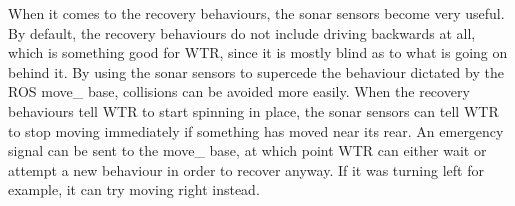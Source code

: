 When it comes to the recovery behaviours, the sonar sensors become very useful.
By default, the recovery behaviours do not include driving backwards at all, which is something good for WTR, since it is mostly blind as to what is going on behind it.
By using the sonar sensors to supercede the behaviour dictated by the ROS move\_ base, collisions can be avoided more easily.
When the recovery behaviours tell WTR to start spinning in place, the sonar sensors can tell WTR to stop moving immediately if something has moved near its rear.
An emergency signal can be sent to the move\_ base, at which point WTR can either wait or attempt a new behaviour in order to recover anyway.
If it was turning left for example, it can try moving right instead.
\newpage
